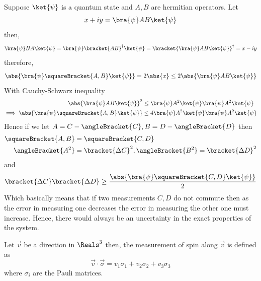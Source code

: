 \begin{remark}
    Suppose \(\ket{\psi}\) is a quantum state and \(A,B\) are hermitian operators. Let 
    \begin{equation*}
        x + iy = \bra{\psi} AB \ket{\psi}
    \end{equation*}
    then, 
    \begin{equation*}
        \bra{\psi} BA \ket{\psi} = \bra{\psi} \bracket{AB}^{\dagger} \ket{\psi} = \bracket{ \bra{\psi} AB \ket{\psi}}^{\dagger} = x - iy
    \end{equation*}
    therefore, 
    \begin{equation*}
        \abs{\bra{\psi} \squareBracket{A,B} \ket{\psi}} = 2\abs{x} \leq 2 \abs{\bra{\psi} AB \ket{\psi}}
    \end{equation*}
    With Cauchy-Schwarz inequality 
    \begin{align*}
        \abs{\bra{\psi} AB \ket{\psi}}^2 &\leq \bra{\psi} A^2 \ket{\psi} \bra{\psi} A^2 \ket{\psi}\\
        \implies \abs{\bra{\psi} \squareBracket{A,B} \ket{\psi}} &\leq 4  \bra{\psi} A^2 \ket{\psi} \bra{\psi} A^2 \ket{\psi}
    \end{align*}
    Hence if we let \(A = C - \angleBracket{C}, B = D - \angleBracket{D}\) then 
    \begin{align*}
        \squareBracket{A,B} &= \squareBracket{C,D} \\
        \angleBracket{A^2} &= \bracket{\Delta C}^2 , \angleBracket{B^2} = \bracket{\Delta D}^2
    \end{align*}
    and 
    \begin{equation*}
        \bracket{\Delta C} \bracket{\Delta D} \geq \dfrac{\abs{\bra{\psi} \squareBracket{C,D} \ket{\psi}}}{2}
    \end{equation*}
    Which basically means that if two measurements \(C,D\) do not commute then as the error in measuring one decreases the error in measuring the other one must increase. Hence, there would always be an uncertainty in the exact properties of the system.
\end{remark}
Let \(\vec{v}\) be a direction in \(\Reals^3\) then, the measurement of spin along \(\vec{v}\) is defined as 
\begin{equation*}
    \vec{v} \cdot \vec{\sigma} = v_1 \sigma_1  + v_2 \sigma_2 + v_3 \sigma_3
\end{equation*}
where \(\sigma_i\) are the Pauli matrices.

